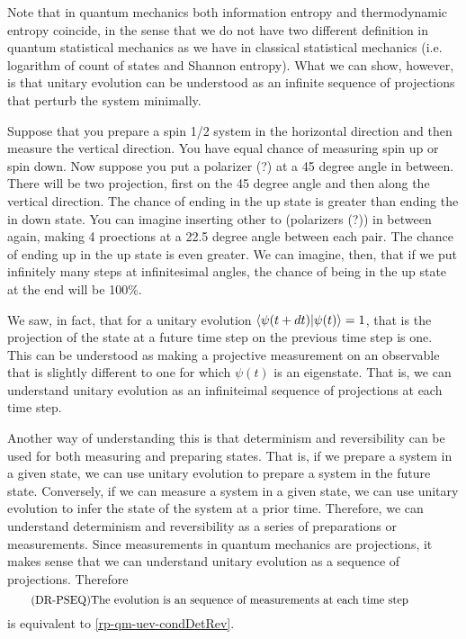Note that in quantum mechanics both information entropy and thermodynamic entropy coincide, in the sense that we do not have two different definition in quantum statistical mechanics as we have in classical statistical mechanics (i.e. logarithm of count of states and Shannon entropy). What we can show, however, is that unitary evolution can be understood as an infinite sequence of projections that perturb the system minimally.

Suppose that you prepare a spin 1/2 system in the horizontal direction and then measure the vertical direction. You have equal chance of measuring spin up or spin down. Now suppose you put a polarizer (?) at a 45 degree angle in between. There will be two projection, first on the 45 degree angle and then along the vertical direction. The chance of ending in the up state is greater than ending the in down state. You can imagine inserting other to (polarizers (?)) in between again, making 4 proections at a 22.5 degree angle between each pair. The chance of ending up in the up state is even greater. We can imagine, then, that if we put infinitely many steps at infinitesimal angles, the chance of being in the up state at the end will be 100\%.

We saw, in fact, that for a unitary evolution $\langle\psi(t+dt) | \psi(t)\rangle =1$, that is the projection of the state at a future time step on the previous time step is one. This can be understood as making a projective measurement on an observable that is slightly different to one for which $\psi(t)$ is an eigenstate. That is, we can understand unitary evolution as an infiniteimal sequence of projections at each time step.

Another way of understanding this is that determinism and reversibility can be used for both measuring and preparing states. That is, if we prepare a system in a given state, we can use unitary evolution to prepare a system in the future state. Conversely, if we can measure a system in a given state, we can use unitary evolution to infer the state of the system at a prior time. Therefore, we can understand determinism and reversibility as a series of preparations or measurements. Since measurements in quantum mechanics are projections, it makes sense that we can understand unitary evolution as a sequence of projections. Therefore 
\begin{equation}\label{rp-qm-uev-condProjectionSequence}
	\tag{DR-PSEQ}
	\eqtext{The evolution is an sequence of measurements at each time step} 
\end{equation}
is equivalent to \ref{rp-qm-uev-condDetRev}.

